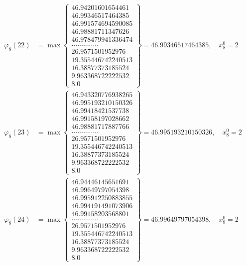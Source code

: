 \documentclass{article}
\begin{document}
\begin{align*}
  
  
  
\varphi_{8}(22) &= \max \left\{ \begin{array}{c}
46.94201601654461 \\
 46.99346517464385 \\
 46.991574694590085 \\
 46.98881711347626 \\
 46.978479941336474 \\
 .............. \\
 26.9571501952976 \\
 19.355446742240513 \\
 16.38877373185524 \\
 9.963368722222532 \\
 8.0
\end{array} \right\} = 46.99346517464385, \quad x_{8}^0 = 2\\
  
  
  
  
\varphi_{8}(23) &= \max \left\{ \begin{array}{c}
46.943320776938265 \\
 46.995193210150326 \\
 46.99418421537738 \\
 46.99158197028662 \\
 46.98881717887766 \\
 .............. \\
 26.9571501952976 \\
 19.355446742240513 \\
 16.38877373185524 \\
 9.963368722222532 \\
 8.0
\end{array} \right\} = 46.995193210150326, \quad x_{8}^0 = 2\\
  
  
  
  
\varphi_{8}(24) &= \max \left\{ \begin{array}{c}
46.94446145651691 \\
 46.99649797054398 \\
 46.995912250883855 \\
 46.994191491073906 \\
 46.99158203568801 \\
 .............. \\
 26.9571501952976 \\
 19.355446742240513 \\
 16.38877373185524 \\
 9.963368722222532 \\
 8.0
\end{array} \right\} = 46.99649797054398, \quad x_{8}^0 = 2\\
  

\end{align*}
\end{document}
